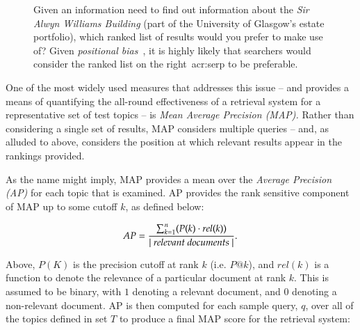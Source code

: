 \begin{figure}[t!]
    \centering
    \caption[The importance of ranking]{Given an information need to find out information about the \emph{Sir Alwyn Williams Building} (part of the University of Glasgow's estate portfolio), which ranked list of results would you prefer to make use of? Given \emph{positional bias}~\citep{craswell2008click_models}, it is highly likely that searchers would consider the ranked list on the right~\gls{acr:serp} to be preferable.}
    \label{fig:ranking}
\end{figure}

One of the most widely used measures that addresses this issue -- and provides a means of quantifying the all-round effectiveness of a retrieval system for a representative set of test topics -- is \emph{Mean Average Precision (MAP).} Rather than considering a single set of results, MAP considers multiple queries -- and, as alluded to above, considers the position at which relevant results appear in the rankings provided.

As the name might imply, MAP provides a mean over the \emph{Average Precision (AP)} for each topic that is examined. AP provides the rank sensitive component of MAP up to some cutoff $k$, as defined below:

\begin{equation*}
AP = \frac{\sum^{n}_{k=1}(P(k) \cdot rel(k))}{|~\text{\emph{relevant documents}}~|}.
\end{equation*}

Above, $P(K)$ is the precision cutoff at rank $k$ (i.e. $P@k$), and $rel(k)$ is a function to denote the relevance of a particular document at rank $k$. This is assumed to be binary, with $1$ denoting a relevant document, and $0$ denoting a non-relevant document. AP is then computed for each sample query, $q$, over all of the topics defined in set $T$ to produce a final MAP score for the retrieval system:

